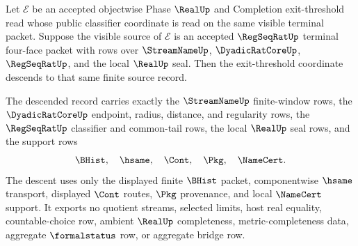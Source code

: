 \begin{theorem}
\label{thm:regseqrat-local-threshold-exit-descent}
Let $\mathcal E$ be an accepted objectwise Phase $\RealUp$ and Completion exit-threshold read whose public classifier coordinate is read on the same visible terminal packet. Suppose the visible source of $\mathcal E$ is an accepted $\RegSeqRatUp$ terminal four-face packet with rows over $\StreamNameUp$, $\DyadicRatCoreUp$, $\RegSeqRatUp$, and the local $\RealUp$ seal. Then the exit-threshold coordinate descends to that same finite source record.

The descended record carries exactly the $\StreamNameUp$ finite-window rows, the $\DyadicRatCoreUp$ endpoint, radius, distance, and regularity rows, the $\RegSeqRatUp$ classifier and common-tail rows, the local $\RealUp$ seal rows, and the support rows
$$
\BHist,\quad \hsame,\quad \Cont,\quad \Pkg,\quad \NameCert.
$$
The descent uses only the displayed finite $\BHist$ packet, componentwise $\hsame$ transport, displayed $\Cont$ routes, $\Pkg$ provenance, and local $\NameCert$ support. It exports no quotient streams, selected limits, host real equality, countable-choice row, ambient $\RealUp$ completeness, metric-completeness data, aggregate $\formalstatus$ row, or aggregate bridge row.
\end{theorem}

